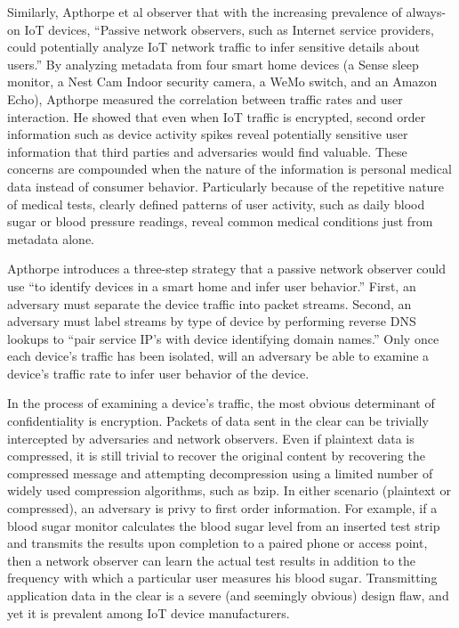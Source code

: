 Similarly, Apthorpe et al observer that with the increasing prevalence of always-on IoT devices, ``Passive network observers, such as Internet service providers, could potentially analyze IoT network traffic to infer sensitive details about users.'' By analyzing metadata from four smart home devices (a Sense sleep monitor, a Nest Cam Indoor security camera, a WeMo switch, and an Amazon Echo), Apthorpe measured the correlation between traffic rates and user interaction. He showed that even when IoT traffic is encrypted, second order information such as device activity spikes reveal potentially sensitive user information that third parties and adversaries would find valuable. These concerns are compounded when the nature of the information is personal medical data instead of consumer behavior. Particularly because of the repetitive nature of medical tests, clearly defined patterns of user activity, such as daily blood sugar or blood pressure readings, reveal common medical conditions just from metadata alone. 

Apthorpe introduces a three-step strategy that a passive network observer could use ``to identify devices in a smart home and infer user behavior.'' First, an adversary must separate the device traffic into packet streams. Second, an adversary must label streams by type of device by performing reverse DNS lookups to ``pair service IP's with device identifying domain names.'' Only once each device's traffic has been isolated, will an adversary be able to examine a device's traffic rate to infer user behavior of the device. 

In the process of examining a device's traffic, the most obvious determinant of confidentiality is encryption. Packets of data sent in the clear can be trivially intercepted by adversaries and network observers. Even if plaintext data is compressed, it is still trivial to recover the original content by recovering the compressed message and attempting decompression using a limited number of widely used compression algorithms, such as bzip. In either scenario (plaintext or compressed), an adversary is privy to first order information. For example, if a blood sugar monitor calculates the blood sugar level from an inserted test strip and transmits the results upon completion to a paired phone or access point, then a network observer can learn the actual test results in addition to the frequency with which a particular user measures his blood sugar. Transmitting application data in the clear is a severe (and seemingly obvious) design flaw, and yet it is prevalent among IoT device manufacturers. 

